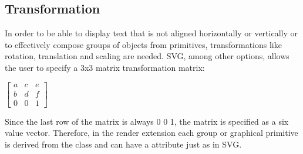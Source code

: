 


\subsection{Transformation}

In order to be able to display text that is not aligned horizontally or 
vertically or to effectively compose groups of objects from primitives, 
transformations like rotation, translation and scaling are needed. SVG, among 
other options, allows the user to specify a 3x3 matrix transformation matrix: 

\hspace*{0.4cm}
\begin{center}
\begin{math}\left[ \begin{array}{ccc} a & c & e \\ b & d & f \\ 0 & 0 & 1\end{array}\right]\end{math}
\end{center}
\hspace*{0.4cm}

Since the last row of the matrix is always 0 0 1, the matrix is specified as a 
six value vector. Therefore, in the render extension each group or graphical 
primitive is derived from the class \TransformationTwoD and can have a  attribute just as in SVG.

